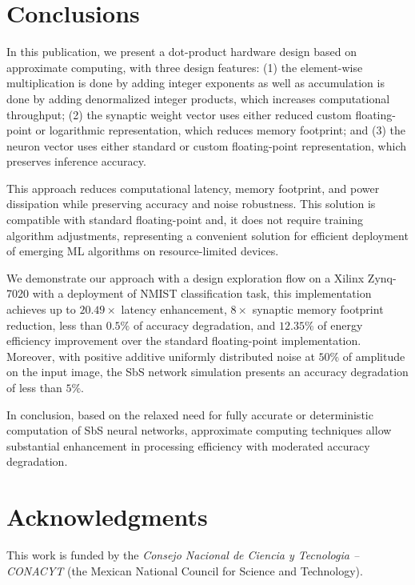 \section{Conclusions}
\label{sec:conclusions}

In this publication, we present a dot-product hardware design based on approximate computing, with three design features: (1) the element-wise multiplication is done by adding integer exponents as well as accumulation is done by adding denormalized integer products, which increases computational throughput; (2) the synaptic weight vector uses either reduced custom floating-point or logarithmic representation, which reduces memory footprint; and (3) the neuron vector uses either standard or custom floating-point representation, which preserves inference accuracy.

This approach reduces computational latency, memory footprint, and power dissipation while preserving accuracy and noise robustness. This solution is compatible with standard floating-point and, it does not require training algorithm adjustments, representing a convenient solution for efficient deployment of emerging ML algorithms on resource-limited devices.

We demonstrate our approach with a design exploration flow on a Xilinx Zynq-7020 with a deployment of NMIST classification task, this implementation achieves up to $20.49\times$ latency enhancement, $8\times$ synaptic memory footprint reduction, less than $0.5\%$ of accuracy degradation, and $12.35\%$ of energy efficiency improvement over the standard floating-point implementation. Moreover, with positive additive uniformly distributed noise at $50\%$ of amplitude on the input image, the SbS network simulation presents an accuracy degradation of less than $5\%$.

In conclusion, based on the relaxed need for fully accurate or deterministic computation of SbS neural networks, approximate computing techniques allow substantial enhancement in processing efficiency with moderated accuracy degradation.

\section * {Acknowledgments}\label{sec:Ack}
This work is funded by the \textit{Consejo Nacional de Ciencia y Tecnologia -- CONACYT} (the Mexican National Council for Science and Technology).
